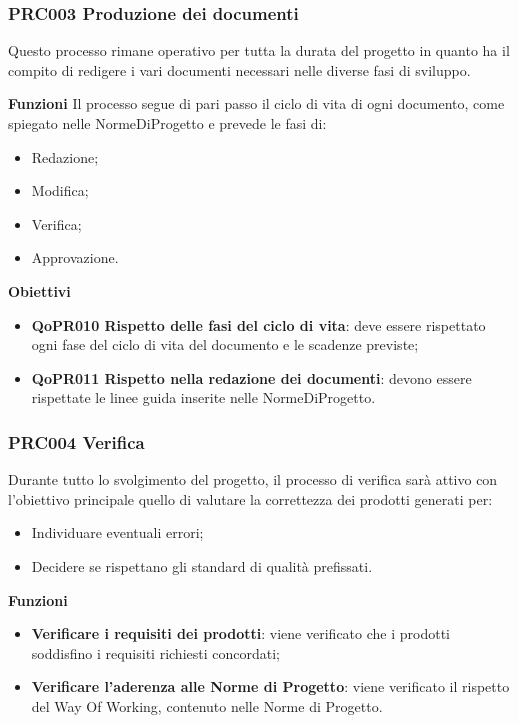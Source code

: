 \documentclass[../piano-di-qualifica.tex]{subfiles}
\begin{document}
\subsubsection{PRC003 Produzione dei documenti}
\label{sub:produzione_dei_documenti}
Questo processo rimane operativo per tutta la durata del progetto in quanto ha il compito di redigere i vari documenti necessari nelle diverse fasi di sviluppo.

\textbf{Funzioni}
Il processo segue di pari passo il ciclo di vita di ogni documento, come spiegato nelle NormeDiProgetto e prevede le fasi di:
\begin{itemize}
    \item Redazione;
    \item Modifica;
    \item Verifica;
    \item Approvazione.        
\end{itemize}

\textbf{Obiettivi}
\begin{itemize}
    \item \textbf{QoPR010 Rispetto delle fasi del ciclo di vita}: deve essere rispettato ogni fase del ciclo di vita del documento e le scadenze previste;
    \item \textbf{QoPR011 Rispetto nella redazione dei documenti}: devono essere rispettate le linee guida inserite nelle NormeDiProgetto.
\end{itemize}

\subsubsection{PRC004 Verifica}
\label{sub:produzione_dei_documenti}
Durante tutto lo svolgimento del progetto, il processo di verifica sarà attivo con l'obiettivo principale quello di valutare la correttezza dei prodotti generati per: 
\begin{itemize}
    \item Individuare eventuali errori;
    \item Decidere se rispettano gli standard di qualità prefissati.
\end{itemize}

\textbf{Funzioni}
\begin{itemize}
    \item \textbf{Verificare i requisiti dei prodotti}: viene verificato che i prodotti soddisfino i requisiti richiesti concordati;
    \item \textbf{Verificare l'aderenza alle Norme di Progetto}: viene verificato il rispetto del Way Of Working, contenuto nelle Norme di Progetto.
\end{itemize}
\end{document}
